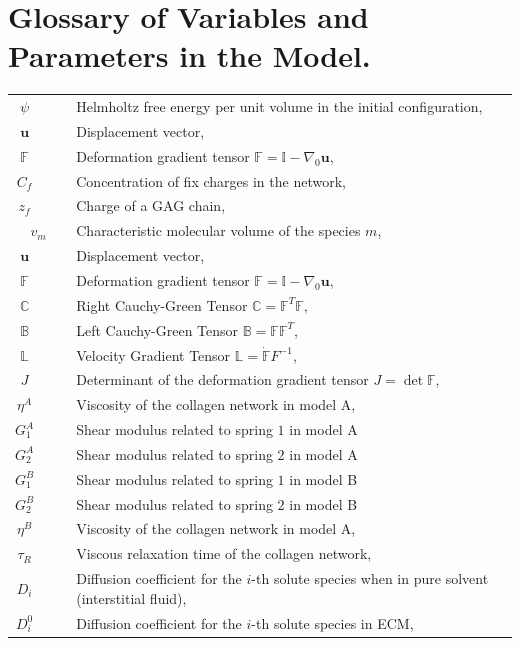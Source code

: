\documentclass[runningheads]{llncs}
\newcommand{\F}{\ensuremath{\mathbb{F}}}
\newcommand{\LL}{\ensuremath{\mathbb{L}}}
\begin{document}
\section{Glossary of Variables and Parameters in the Model.}
\begin{table}[h]
\begin{tabular}{c  l}
	$\psi\qquad $ & Helmholtz free energy per unit volume in the initial configuration,\\
	$\mathbf{u}\qquad$ & Displacement vector,\\
	$\F\qquad$ & Deformation gradient tensor $\F=\mathbb{I}-\nabla_0\mathbf{u}$,\\
	$C_f\qquad$ & Concentration of fix charges in the network,\\
	$z_f\qquad$ & Charge of a GAG chain,\\
	$v_m$ & Characteristic molecular volume of the species $m$,\\
	$\mathbf{u}\qquad$ & Displacement vector,\\
	$\F\qquad$ & Deformation gradient tensor $\F=\mathbb{I}-\nabla_0\mathbf{u}$,\\	
	$\mathbb{C}\qquad$ & Right Cauchy-Green Tensor $\mathbb{C}=\F^T\F$,\\
	$\mathbb{B}\qquad$ & Left Cauchy-Green Tensor $\mathbb{B}=\F\F^T$,\\
	$\LL\qquad$ & Velocity Gradient Tensor $\LL=\dot{\F}F^{-1}$,\\
	$J\qquad$ & Determinant of the deformation gradient tensor $J=\det \F$,\\
	$\eta^A\qquad $ & Viscosity of the collagen network in model A,\\
	$G^A_1\qquad$ & Shear modulus related to spring $1$ in model A\\
	$G^A_2\qquad$ & Shear modulus related to spring $2$ in model A\\
	$G^B_1\qquad$ & Shear modulus related to spring $1$ in model B\\
	$G^B_2\qquad$ & Shear modulus related to spring $2$ in model B\\
	$\eta^B\qquad$ & Viscosity of the collagen network in model A,\\
	$\tau_R\qquad$ & Viscous relaxation time of the collagen network,\\
	$D_i\qquad$ & Diffusion coefficient for the $i$-th solute species when in pure solvent (interstitial fluid),\\
	$D^0_i\qquad$ & Diffusion coefficient for the $i$-th solute species in ECM,\\

\end{tabular}
\end{table}
\end{document}
